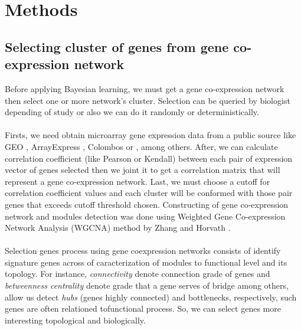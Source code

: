 \documentclass{bmcart}
\begin{document}
\section*{Methods}
\subsection*{Selecting cluster of genes from gene co-expression network}
Before applying Bayesian learning, we must get a gene co-expression network then select one or more network\textquoteright s cluster. Selection can be queried by biologist depending of study or also we can do it randomly or deterministically.\\
\\
Firsts, we need obtain microarray gene expression data from a public source like GEO \cite{doi:10.1093/nar/gks1193}, ArrayExpress \cite{doi:10.1093/nar/gku1057}, Colombos \cite{doi:10.1093/nar/gkv1251} or \cite{doi:10.1093/nar/gkm815}, among others. After, we can calculate correlation coefficient (like Pearson or Kendall) between each pair of expression vector of genes selected then we joint it to get a correlation matrix that will represent a gene co-expression network. Last, we must choose a cutoff for correlation coefficient values and each cluster will be conformed with those pair genes that exceeds cutoff threshold chosen. Constructing of gene co-expression network and modules detection was done using Weighted Gene Co-expression Network Analysis (WGCNA) method by Zhang and Horvath \cite{Zhang05ageneral}.\\
\\
Selection genes process using gene coexpression networks consists of identify signature genes across of caracterization of modules to functional level and its topology. For instance, \emph{connectivity} denote connection grade of genes and \emph{betweenness centrality} denote grade that a gene serves of bridge among others, allow us detect \emph{hubs} (genes highly connected) and bottlenecks, respectively, such genes are often relationed tofunctional process. So, we can select genes more interesting topological and biologically.
\end{document}
